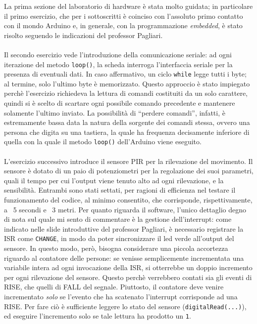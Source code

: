 \documentclass[12pt,a4paper]{article}
\begin{document}
La prima sezione del laboratorio di hardware è stata molto guidata; in particolare il primo esercizio, che per i sottoscritti è coinciso con l'assoluto primo contatto con il mondo Arduino e, in generale, con la programmazione \textit{embedded}, è stato risolto seguendo le indicazioni del professor Pagliari.
\\ \\
Il secondo esercizio vede l'introduzione della comunicazione seriale: ad ogni iterazione del metodo \verb|loop()|, la scheda interroga l'interfaccia seriale per la presenza di eventuali dati. In caso affermativo, un ciclo \verb|while| legge tutti i byte; al termine, solo l'ultimo byte è memorizzato. Questo approccio è stato impiegato perchè l'esercizio richiedeva la lettura di comandi costituiti da un solo carattere, quindi si è scelto di scartare ogni possibile comando precedente e mantenere solamente l'ultimo inviato. La possibilità di ``perdere comandi'', infatti, è estremamente bassa data la natura della sorgente dei comandi stessa, ovvero una persona che digita su una tastiera, la quale ha frequenza decisamente inferiore di quella con la quale il metodo \verb|loop()| dell'Arduino viene eseguito.
\\ \\
L'esercizio successivo introduce il sensore PIR per la rilevazione del movimento. Il sensore è dotato di un paio di potenziometri per la regolazione dei suoi parametri, quali il tempo per cui l'output viene tenuto alto ad ogni rilevazione, e la sensibilità. Entrambi sono stati settati, per ragioni di efficienza nel testare il funzionamento del codice, al minimo consentito, che corrisponde, rispettivamente, a ~5 secondi e ~3 metri. Per quanto riguarda il software, l'unico dettaglio degno di nota sul quale mi sento di commentare è la gestione dell'interrupt: come indicato nelle slide introduttive del professor Pagliari, è necessario registrare la ISR come \verb|CHANGE|, in modo da poter sincronizzare il led verde all'output del sensore. In questo modo, però, bisogna considerare una piccola accortezza riguardo al contatore delle persone: se venisse semplicemente incrementata una variabile intera ad ogni invocazione della ISR, si otterrebbe un doppio incremento per ogni rilevazione del sensore. Questo perchè verrebbero contati sia gli eventi di RISE, che quelli di FALL del segnale. Piuttosto, il contatore deve venire incrementato \textit{solo} se l'evento che ha scatenato l'interrupt corrisponde ad una RISE. Per fare ciò è sufficiente leggere lo stato del sensore (\verb|digitalRead(...)|), ed eseguire l'incremento solo se tale lettura ha prodotto un \verb|1|.
\end{document}
